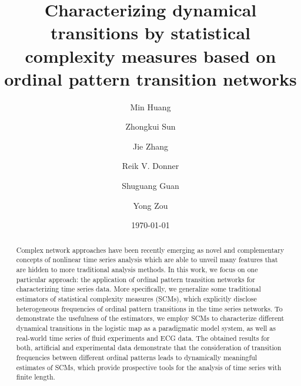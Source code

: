 \documentclass[12pt,aip,cha,reprint,nofootinbib]{revtex4-1}
\begin{document}
\title{Characterizing dynamical transitions by statistical complexity measures based on ordinal pattern transition networks} 

\author{Min Huang}

\author{Zhongkui Sun}

\author{Jie Zhang}

\author{Reik V. Donner}

\author{Shuguang Guan}
	
\author{Yong Zou}

\date{\today}

\begin{abstract}
Complex network approaches have been recently emerging as novel and complementary concepts of nonlinear time series analysis which are able to unveil many features that are hidden to more traditional analysis methods. In this work, we focus on one particular approach: the application of ordinal pattern transition networks for characterizing time series data. More specifically, we generalize some traditional estimators of statistical complexity measures (SCMs), which explicitly disclose heterogeneous frequencies of ordinal pattern transitions in the time series networks. To demonstrate the usefulness of the estimators, we employ SCMs to characterize different dynamical transitions in the logistic map as a paradigmatic model system, as well as real-world time series of fluid experiments and ECG data. The obtained results for both, artificial and experimental data demonstrate that the consideration of transition frequencies between different ordinal patterns leads to dynamically meaningful estimates of SCMs, which provide prospective tools for the analysis of time series with finite length. 
\end{abstract}
\end{document}
